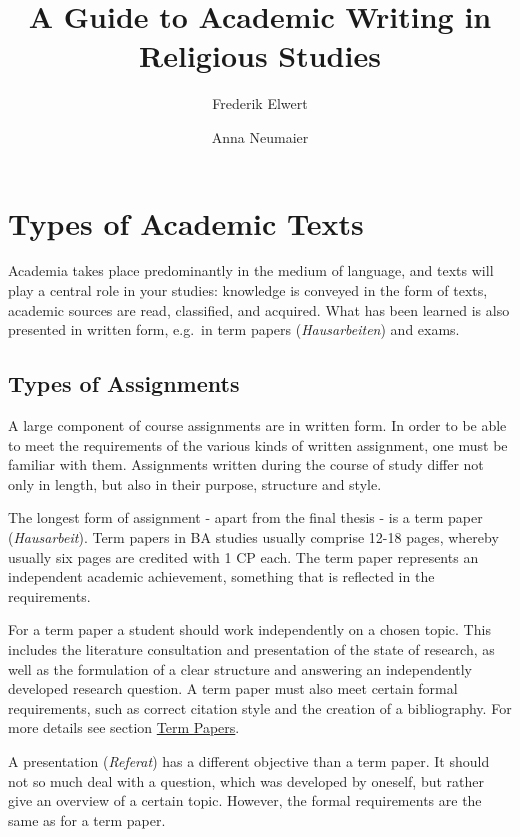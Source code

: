 \documentclass[
  english,
]{scrreprt}
\title{A Guide to Academic Writing in Religious Studies}
\author{Frederik Elwert \and Anna Neumaier}
\date{}
\begin{document}
\maketitle

{
\hypersetup{linkcolor=}
\setcounter{tocdepth}{1}
\tableofcontents
}
\chapter{Types of Academic Texts}\label{types-of-academic-texts}

Academia takes place predominantly in the medium of language, and texts will play a central role in your studies: knowledge is conveyed in the form of texts, academic sources are read, classified, and acquired. What has been learned is also presented in written form, e.g.~in term papers (\emph{Hausarbeiten}) and exams.

\section{Types of Assignments}\label{sec:assignments}

A large component of course assignments are in written form. In order to be able to meet the requirements of the various kinds of written assignment, one must be familiar with them. Assignments written during the course of study differ not only in length, but also in their purpose, structure and style.

The longest form of assignment - apart from the final thesis - is a term paper (\emph{Hausarbeit}). Term papers in BA studies usually comprise 12-18 pages, whereby usually six pages are credited with 1 CP each. The term paper represents an independent academic achievement, something that is reflected in the requirements.

For a term paper a student should work independently on a chosen topic. This includes the literature consultation and presentation of the state of research, as well as the formulation of a clear structure and answering an independently developed research question. A term paper must also meet certain formal requirements, such as correct citation style and the creation of a bibliography. For more details see section \hyperref[sec:term_papers]{Term Papers}.

A presentation (\emph{Referat}) has a different objective than a term paper. It should not so much deal with a question, which was developed by oneself, but rather give an overview of a certain topic. However, the formal requirements are the same as for a term paper.
\end{document}
